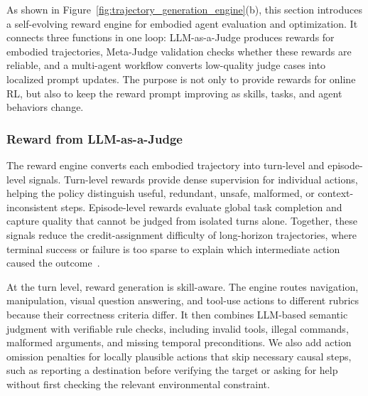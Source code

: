 As shown in Figure~\ref{fig:trajectory_generation_engine}(b), this section introduces a self-evolving reward engine for embodied agent evaluation and optimization. It connects three functions in one loop: LLM-as-a-Judge produces rewards for embodied trajectories, Meta-Judge validation checks whether these rewards are reliable, and a multi-agent workflow converts low-quality judge cases into localized prompt updates. The purpose is not only to provide rewards for online RL, but also to keep the reward prompt improving as skills, tasks, and agent behaviors change.

\subsubsection{Reward from LLM-as-a-Judge}
\label{subsec:multi_tier_reward}

The reward engine converts each embodied trajectory into turn-level and episode-level signals. Turn-level rewards provide dense supervision for individual actions, helping the policy distinguish useful, redundant, unsafe, malformed, or context-inconsistent steps. Episode-level rewards evaluate global task completion and capture quality that cannot be judged from isolated turns alone. Together, these signals reduce the credit-assignment difficulty of long-horizon trajectories, where terminal success or failure is too sparse to explain which intermediate action caused the outcome~\citep{wei2025reinforcing}.

At the turn level, reward generation is skill-aware. The engine routes navigation, manipulation, visual question answering, and tool-use actions to different rubrics because their correctness criteria differ. It then combines LLM-based semantic judgment with verifiable rule checks, including invalid tools, illegal commands, malformed arguments, and missing temporal preconditions. We also add action omission penalties for locally plausible actions that skip necessary causal steps, such as reporting a destination before verifying the target or asking for help without first checking the relevant environmental constraint.

